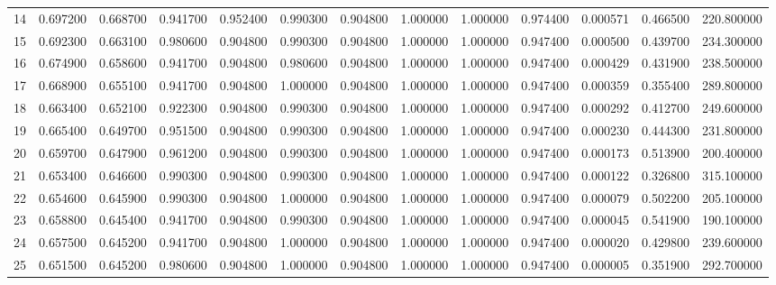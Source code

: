\begin{tabular}{rrrrrrrrrrrrr}
14 & 0.697200 & 0.668700 & 0.941700 & 0.952400 & 0.990300 & 0.904800 & 1.000000 & 1.000000 & 0.974400 & 0.000571 & 0.466500 & 220.800000 \\
15 & 0.692300 & 0.663100 & 0.980600 & 0.904800 & 0.990300 & 0.904800 & 1.000000 & 1.000000 & 0.947400 & 0.000500 & 0.439700 & 234.300000 \\
16 & 0.674900 & 0.658600 & 0.941700 & 0.904800 & 0.980600 & 0.904800 & 1.000000 & 1.000000 & 0.947400 & 0.000429 & 0.431900 & 238.500000 \\
17 & 0.668900 & 0.655100 & 0.941700 & 0.904800 & 1.000000 & 0.904800 & 1.000000 & 1.000000 & 0.947400 & 0.000359 & 0.355400 & 289.800000 \\
18 & 0.663400 & 0.652100 & 0.922300 & 0.904800 & 0.990300 & 0.904800 & 1.000000 & 1.000000 & 0.947400 & 0.000292 & 0.412700 & 249.600000 \\
19 & 0.665400 & 0.649700 & 0.951500 & 0.904800 & 0.990300 & 0.904800 & 1.000000 & 1.000000 & 0.947400 & 0.000230 & 0.444300 & 231.800000 \\
20 & 0.659700 & 0.647900 & 0.961200 & 0.904800 & 0.990300 & 0.904800 & 1.000000 & 1.000000 & 0.947400 & 0.000173 & 0.513900 & 200.400000 \\
21 & 0.653400 & 0.646600 & 0.990300 & 0.904800 & 0.990300 & 0.904800 & 1.000000 & 1.000000 & 0.947400 & 0.000122 & 0.326800 & 315.100000 \\
22 & 0.654600 & 0.645900 & 0.990300 & 0.904800 & 1.000000 & 0.904800 & 1.000000 & 1.000000 & 0.947400 & 0.000079 & 0.502200 & 205.100000 \\
23 & 0.658800 & 0.645400 & 0.941700 & 0.904800 & 0.990300 & 0.904800 & 1.000000 & 1.000000 & 0.947400 & 0.000045 & 0.541900 & 190.100000 \\
24 & 0.657500 & 0.645200 & 0.941700 & 0.904800 & 1.000000 & 0.904800 & 1.000000 & 1.000000 & 0.947400 & 0.000020 & 0.429800 & 239.600000 \\
25 & 0.651500 & 0.645200 & 0.980600 & 0.904800 & 1.000000 & 0.904800 & 1.000000 & 1.000000 & 0.947400 & 0.000005 & 0.351900 & 292.700000 \\
\bottomrule
\end{tabular}
